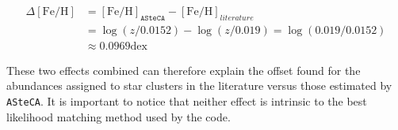 \documentclass[draft]{aa}
\begin{document}
\begin{equation}
\begin{split}
\Delta\mathrm{[Fe/H]} & = \mathrm{[Fe/H]}_{\mathtt{ASteCA}} -
\mathrm{[Fe/H]}_{literature} \\
& = \log(z/0.0152) - \log(z/0.019) = \log(0.019/0.0152) \\
& \approx 0.0969 \mathrm{dex}
\end{split}
\label{eq:delta_feh}
\end{equation}

\noindent These two effects combined can therefore explain the offset found
for the abundances assigned to star clusters in the literature versus those
estimated by \texttt{ASteCA}. It is important to notice that neither effect is
intrinsic to the best likelihood matching method used by the code.
\end{document}
